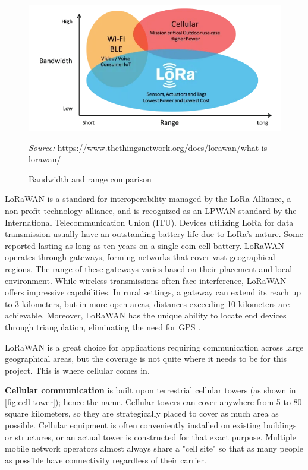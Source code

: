 \documentclass[FM,BP,EN,fonts]{tulthesis}
\begin{document}
\begin{figure}[H]
    \centering
    \includegraphics[scale=.7]{media/lora-bandwidth-vs-range.png}
    \caption{Bandwidth and range comparison}
    \textit{Source:} https://www.thethingsnetwork.org/docs/lorawan/what-is-lorawan/
    \label{fig:lora-wifi-cellular-comparison}
\end{figure}

LoRaWAN is a standard for interoperability managed by the LoRa Alliance, a non-profit technology alliance, and is recognized as an LPWAN standard by the International Telecommunication Union (ITU). Devices utilizing LoRa for data transmission usually have an outstanding battery life due to LoRa's nature. Some reported lasting as long as ten years on a single coin cell battery. LoRaWAN operates through gateways, forming networks that cover vast geographical regions. The range of these gateways varies based on their placement and local environment. While wireless transmissions often face interference, LoRaWAN offers impressive capabilities. In rural settings, a gateway can extend its reach up to 3 kilometers, but in more open areas, distances exceeding 10 kilometers are achievable. Moreover, LoRaWAN has the unique ability to locate end devices through triangulation, eliminating the need for GPS \cite{what-is-lorawan}.

LoRaWAN is a great choice for applications requiring communication across large geographical areas, but the coverage is not quite where it needs to be for this project. This is where cellular comes in.

\textbf{Cellular communication} is built upon terrestrial cellular towers (as shown in \autoref{fig:cell-tower}); hence the name. Cellular towers can cover anywhere from 5 to 80 square kilometers, so they are strategically placed to cover as much area as possible. Cellular equipment is often conveniently installed on existing buildings or structures, or an actual tower is constructed for that exact purpose. Multiple mobile network operators almost always share a "cell site" so that as many people as possible have connectivity regardless of their carrier.
\end{document}
